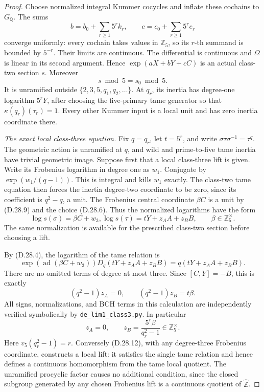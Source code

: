 \begin{proof}
Choose normalized integral Kummer cocycles
and inflate these cochains to
\(G_{\mathbb Q}\). The sums
\[
 b=b_0+\sum_{r\ge1}5^rk_r,
 \qquad c=c_0+\sum_{r\ge1}5^re_r             \tag{D.28.8}
\]
converge uniformly: every cochain takes
values in \(\mathbb Z_5\), so its
\(r\)-th summand is bounded by
\(5^{-r}\). Their limits are continuous.
The differential is continuous and
\(\Omega\) is linear in its second
argument. Hence
\(\exp(aX+bY+cC)\) is an actual
class-two section \(s\). Moreover
\[
                         s\bmod5=s_0\bmod5.    \tag{D.28.9}
\]
It is unramified outside
\(\{2,3,5,q_1,q_2,\ldots\}\). At
\(q_r\), its inertia has degree-one
logarithm \(5^rY\), after choosing the
five-primary tame generator so that
\(\kappa(q_r)(\tau_r)=1\). Every
other Kummer input is a local unit and
has zero inertia coordinate there.

\emph{The exact local class-three equation.}
Fix \(q=q_r\), let \(t=5^r\), and
write \(\sigma\tau\sigma^{-1}=\tau^q\).
The geometric action is unramified at
\(q\), and wild and prime-to-five tame
inertia have trivial geometric image.
Suppose first that a local class-three
lift is given. Write its Frobenius
logarithm in degree one as \(w_1\).
Conjugate by \(\exp(w_1/(q-1))\).
This is integral and kills \(w_1\)
exactly. The class-two tame equation
then forces the inertia degree-two
coordinate to be zero, since its
coefficient is \(q^2-q\), a unit.
The Frobenius central coordinate
\(\beta C\) is a unit by (D.28.9)
and the choice (D.28.6). Thus the
normalized logarithms have the form
\[
       \log s(\sigma)=\beta C+w_3,
       \log s(\tau)=tY+z_AA+z_BB,
       \qquad \beta\in\mathbb Z_5^\times.       \tag{D.28.10}
\]
The same normalization is available for
the prescribed class-two section before
choosing a lift.

By (D.28.4), the logarithm of the tame
relation is
\[
 \exp(\operatorname{ad}(\beta C+w_3))
       D_q(tY+z_AA+z_BB)
       =q(tY+z_AA+z_BB).
\]
There are no omitted terms of degree
at most three. Since \([C,Y]=-B\),
this is exactly
\[
       (q^2-1)z_A=0,\qquad
       (q^2-1)z_B=t\beta.                      \tag{D.28.11}
\]
All signs, normalizations, and BCH terms
in this calculation are independently
verified symbolically by
\texttt{de\_lim1\_class3.py}. In particular
\[
         z_A=0,\qquad
         z_B=\frac{5^r\beta}{q_r^2-1}
                    \in\mathbb Z_5^\times.     \tag{D.28.12}
\]
Here \(v_5(q_r^2-1)=r\). Conversely
(D.28.12), with any degree-three
Frobenius coordinate, constructs a local
lift: it satisfies the single tame
relation and hence defines a continuous
homomorphism from the tame local quotient.
The unramified procyclic factor causes
no additional condition, since the
closed subgroup generated by any chosen
Frobenius lift is a continuous quotient
of \(\widehat{\mathbb Z}\).


\end{proof}

